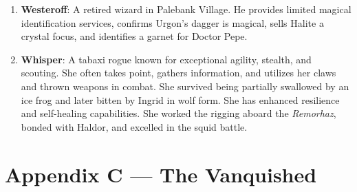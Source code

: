 \documentclass[
  letterpaper,12pt,twoside,twocolumn,openany,
  nodeprecatedcode,bg=full]{dndbook}
\begin{document}
\begin{enumerate}
  them.
\item
  \textbf{Westeroff}: A retired wizard in Palebank Village. He provides
  limited magical identification services, confirms Urgon's dagger is
  magical, sells Halite a crystal focus, and identifies a garnet for
  Doctor Pepe.
\item
  \textbf{Whisper}: A tabaxi rogue known for exceptional agility,
  stealth, and scouting. She often takes point, gathers information, and
  utilizes her claws and thrown weapons in combat. She survived being
  partially swallowed by an ice frog and later bitten by Ingrid in wolf
  form. She has enhanced resilience and self-healing capabilities. She
  worked the rigging aboard the \emph{Remorhaz}, bonded with Haldor, and
  excelled in the squid battle.
\end{enumerate}

\chapter{Appendix C --- The Vanquished}\label{appendix-c-the-vanquished}
\end{document}
